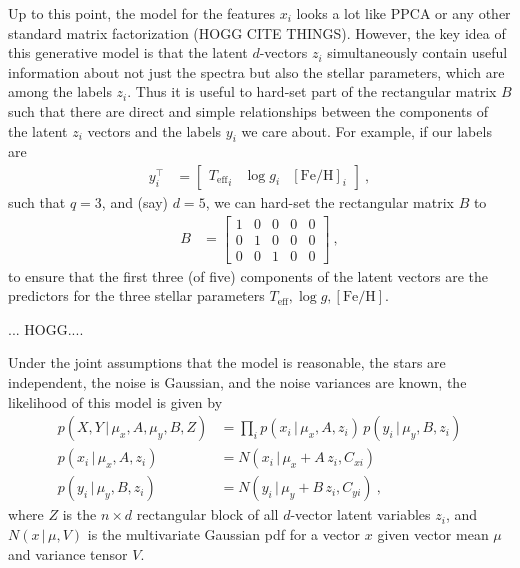 \documentclass[modern]{aastex631}
\newcommand{\given}{\,|\,}
\newcommand{\teff}{{T_{\mathrm{eff}}}}
\newcommand{\logg}{\log g}
\newcommand{\feh}{[\mathrm{Fe}/\mathrm{H}]}
\begin{document}
Up to this point, the model for the features $x_i$ looks a lot like PPCA or any other standard matrix factorization (HOGG CITE THINGS).
However, the key idea of this generative model is that the latent $d$-vectors $z_i$ simultaneously contain useful information about not just the spectra but also the stellar parameters, which are among the labels $z_i$.
Thus it is useful to hard-set part of the rectangular matrix $B$ such that there are direct and simple relationships between the components of the latent $z_i$ vectors and the labels $y_i$ we care about.
For example, if our labels are
\begin{align}
  y_i^\top &= \begin{bmatrix}\teff_i & \logg_i & \feh_i\end{bmatrix} ~,
\end{align}
such that $q=3$, and (say) $d=5$, we can hard-set the rectangular matrix $B$ to
\begin{align}
  B &= \begin{bmatrix}
    1 & 0 & 0 & 0 & 0 \\
    0 & 1 & 0 & 0 & 0 \\
    0 & 0 & 1 & 0 & 0
    \end{bmatrix} ~,
\end{align}
to ensure that the first three (of five) components of the latent vectors are the predictors for the three stellar parameters $\teff, \logg, \feh$.

  ... HOGG....

Under the joint assumptions that the model is reasonable, the stars are independent, the noise is Gaussian, and the noise variances are known, the likelihood of this model is given by
\begin{align}
  p(X, Y\given \mu_x, A, \mu_y, B, Z) &= \prod_i p(x_i\given \mu_x, A, z_i)\,p(y_i\given \mu_y, B, z_i) \\
  p(x_i\given \mu_x, A, z_i) &= N(x_i\given \mu_x + A\,z_i, C_{xi}) \\
  p(y_i\given \mu_y, B, z_i) &= N(y_i\given \mu_y + B\,z_i, C_{yi}) ~,
\end{align}
where $Z$ is the $n\times d$ rectangular block of all $d$-vector latent variables $z_i$,
and $N(x\given\mu,V)$ is the multivariate Gaussian pdf for a vector $x$ given vector mean $\mu$ and variance tensor $V$.
\end{document}
